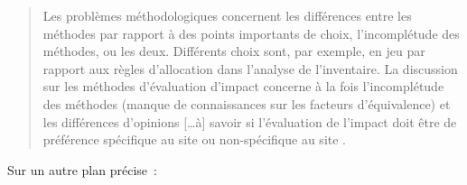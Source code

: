 \blockcquote[traduction]{udo_de_haes_applications_1993}{
Les problèmes méthodologiques concernent les différences entre les méthodes par rapport à des points importants de choix, l'incomplétude des méthodes, ou les deux.
Différents choix sont, par exemple, en jeu par rapport aux règles d'allocation dans l'analyse de l'inventaire.
La discussion sur les méthodes d'évaluation d'impact concerne à la fois l'incomplétude des méthodes (manque de connaissances sur les facteurs d'équivalence) et les différences d'opinions [\ldots à]
savoir si l'évaluation de l'impact doit être de préférence spécifique au site ou non-spécifique au site
.}
Sur un autre plan \citeauthor{udo_de_haes_applications_1993} précise~:

